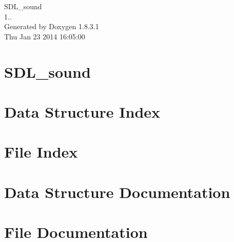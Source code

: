 \documentclass{book}
\begin{document}
\begin{titlepage}
\vspace*{7cm}
\begin{center}
{\Large S\-D\-L\-\_\-sound \\[1ex]\large 1.. }\\
\vspace*{1cm}
{\large Generated by Doxygen 1.8.3.1}\\
\vspace*{0.5cm}
{\small Thu Jan 23 2014 16:05:00}\\
\end{center}
\end{titlepage}
\clearemptydoublepage
{}
\tableofcontents
\clearemptydoublepage
{}
\chapter{S\-D\-L\-\_\-sound}
\label{index}
\chapter{Data Structure Index}

\chapter{File Index}

\chapter{Data Structure Documentation}




\chapter{File Documentation}

\printindex
\end{document}
